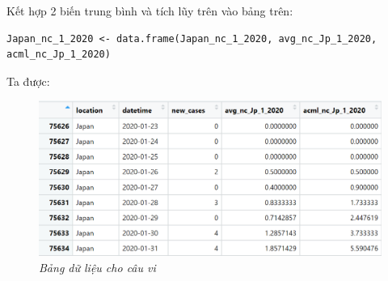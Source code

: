 \documentclass[a4paper]{article}
\theoremstyle{definition}
\begin{document}
	Kết hợp 2 biến trung bình và tích lũy trên vào bảng trên:
		
\begin{lstlisting}
Japan_nc_1_2020 <- data.frame(Japan_nc_1_2020, avg_nc_Jp_1_2020, acml_nc_Jp_1_2020)
\end{lstlisting}
		
		Ta được:\\
		\begin{figure}[H]
	    \begin{center}
            \includegraphics{vi/jp_nc_1_20201.png}
	    \end{center}
	   \vspace{+3mm}\caption{\it Bảng dữ liệu cho câu vi}
	   \end{figure}
	
\end{document}
